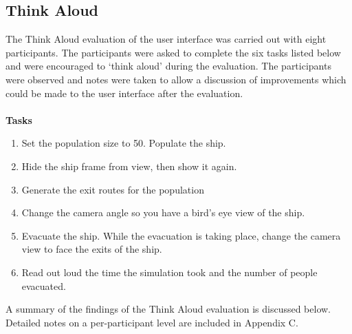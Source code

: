 \subsection{Think Aloud}
The Think Aloud evaluation of the user interface was carried out with eight participants. The participants were asked to complete the six tasks listed below and were encouraged to ‘think aloud’ during the evaluation. The participants were observed and notes were taken to allow a discussion of improvements which could be made to the user interface after the evaluation.
\\
\\
\textbf{Tasks}
\begin{enumerate}
\item Set the population size to 50. Populate the ship.
\item Hide the ship frame from view, then show it again.
\item Generate the exit routes for the population
\item Change the camera angle so you have a bird’s eye view of the ship.
\item Evacuate the ship. While the evacuation is taking place, change the camera view to face the exits of the ship.
\item Read out loud the time the simulation took and the number of people evacuated.
\end{enumerate}
A summary of the findings of the Think Aloud evaluation is discussed below. Detailed notes on a per-participant level are included in Appendix C.


